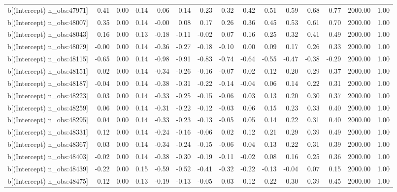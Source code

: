 \begin{table}[ht]
\begin{tabular}{rrrrrrrrrrrrrrr}
  b[(Intercept) n\_obs:47971] & 0.41 & 0.00 & 0.14 & 0.06 & 0.14 & 0.23 & 0.32 & 0.42 & 0.51 & 0.59 & 0.68 & 0.77 & 2000.00 & 1.00 \\ 
  b[(Intercept) n\_obs:48007] & 0.35 & 0.00 & 0.14 & -0.00 & 0.08 & 0.17 & 0.26 & 0.36 & 0.45 & 0.53 & 0.61 & 0.70 & 2000.00 & 1.00 \\ 
  b[(Intercept) n\_obs:48043] & 0.16 & 0.00 & 0.13 & -0.18 & -0.11 & -0.02 & 0.07 & 0.16 & 0.25 & 0.32 & 0.41 & 0.49 & 2000.00 & 1.00 \\ 
  b[(Intercept) n\_obs:48079] & -0.00 & 0.00 & 0.14 & -0.36 & -0.27 & -0.18 & -0.10 & 0.00 & 0.09 & 0.17 & 0.26 & 0.33 & 2000.00 & 1.00 \\ 
  b[(Intercept) n\_obs:48115] & -0.65 & 0.00 & 0.14 & -0.98 & -0.91 & -0.83 & -0.74 & -0.64 & -0.55 & -0.47 & -0.38 & -0.29 & 2000.00 & 1.00 \\ 
  b[(Intercept) n\_obs:48151] & 0.02 & 0.00 & 0.14 & -0.34 & -0.26 & -0.16 & -0.07 & 0.02 & 0.12 & 0.20 & 0.29 & 0.37 & 2000.00 & 1.00 \\ 
  b[(Intercept) n\_obs:48187] & -0.04 & 0.00 & 0.14 & -0.38 & -0.31 & -0.22 & -0.14 & -0.04 & 0.06 & 0.14 & 0.22 & 0.31 & 2000.00 & 1.00 \\ 
  b[(Intercept) n\_obs:48223] & 0.03 & 0.00 & 0.14 & -0.33 & -0.25 & -0.15 & -0.06 & 0.03 & 0.13 & 0.20 & 0.30 & 0.37 & 2000.00 & 1.00 \\ 
  b[(Intercept) n\_obs:48259] & 0.06 & 0.00 & 0.14 & -0.31 & -0.22 & -0.12 & -0.03 & 0.06 & 0.15 & 0.23 & 0.33 & 0.40 & 2000.00 & 1.00 \\ 
  b[(Intercept) n\_obs:48295] & 0.04 & 0.00 & 0.14 & -0.33 & -0.23 & -0.13 & -0.05 & 0.05 & 0.14 & 0.22 & 0.31 & 0.40 & 2000.00 & 1.00 \\ 
  b[(Intercept) n\_obs:48331] & 0.12 & 0.00 & 0.14 & -0.24 & -0.16 & -0.06 & 0.02 & 0.12 & 0.21 & 0.29 & 0.39 & 0.49 & 2000.00 & 1.00 \\ 
  b[(Intercept) n\_obs:48367] & 0.03 & 0.00 & 0.14 & -0.34 & -0.24 & -0.15 & -0.06 & 0.04 & 0.13 & 0.22 & 0.31 & 0.39 & 2000.00 & 1.00 \\ 
  b[(Intercept) n\_obs:48403] & -0.02 & 0.00 & 0.14 & -0.38 & -0.30 & -0.19 & -0.11 & -0.02 & 0.08 & 0.16 & 0.25 & 0.36 & 2000.00 & 1.00 \\ 
  b[(Intercept) n\_obs:48439] & -0.22 & 0.00 & 0.15 & -0.59 & -0.52 & -0.41 & -0.32 & -0.22 & -0.13 & -0.04 & 0.07 & 0.15 & 2000.00 & 1.00 \\ 
  b[(Intercept) n\_obs:48475] & 0.12 & 0.00 & 0.13 & -0.19 & -0.13 & -0.05 & 0.03 & 0.12 & 0.22 & 0.30 & 0.39 & 0.45 & 2000.00 & 1.00 \\ 

\end{tabular}
\end{table}
